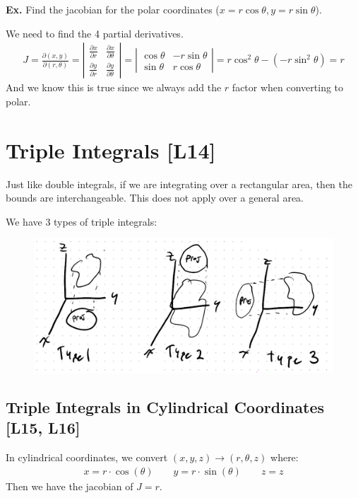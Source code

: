\documentclass[12pt,letterpaper]{article} \usepackage{amsmath} \usepackage{graphicx} \usepackage[margin=1in]{geometry} \usepackage{longtable}  \usepackage{amssymb}
\begin{document}
	\begin{mdframed}[]
	\textbf{Ex. } Find the jacobian for the polar coordinates ($x=r\cos\theta, y=r\sin\theta$).
	
	We need to find the 4 partial derivatives. 
	\begin{align*}
		J = \frac{\partial (x,y) }{\partial (r,\theta)} = \left|\begin{array}{cc} \frac{\partial x}{\partial r} & \frac{\partial x}{\partial \theta} \\ \frac{\partial y}{\partial r} & \frac{\partial y}{\partial \theta} \end{array}\right| = \left|\begin{array}{cc} \cos\theta & -r\sin\theta \\ \sin\theta & r\cos\theta \end{array}\right| = r\cos^2\theta - (-r\sin^2\theta) = r
	\end{align*}
	And we know this is true since we always add the $r$ factor when converting to polar.
	\end{mdframed}
	
	\section{Triple Integrals [L14]}
	Just like double integrals, if we are integrating over a rectangular area, then the bounds are interchangeable. This does not apply over a general area.
	
	We have 3 types of triple integrals:
	
	\begin{figure}[H]
		\centering
		\includegraphics[width=0.7\linewidth]{screenshot001}
	\end{figure}
	
	\subsection{Triple Integrals in Cylindrical Coordinates [L15, L16]}
	In cylindrical coordinates, we convert $(x,y,z) \to (r,\theta, z)$ where:
	\begin{align*}
		x = r\cdot \cos(\theta) \qquad y = r\cdot \sin(\theta) \qquad z = z
	\end{align*}
	Then we have the jacobian of $J=r$.
	
\end{document}
